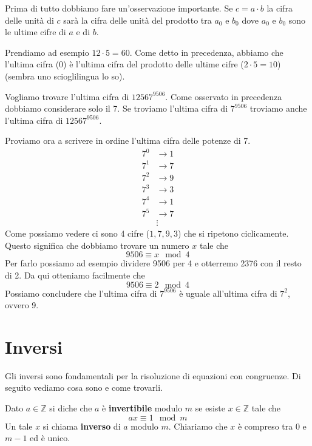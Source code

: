 Prima di tutto dobbiamo fare un'osservazione importante. Se $c = a \cdot b$ la cifra delle
unit\`a di $c$ sar\`a la cifra delle unit\`a del prodotto tra $a_0$ e $b_0$ dove $a_0$ e $b_0$
sono le ultime cifre di $a$ e di $b$.

\begin{example}
	Prendiamo ad esempio $12 \cdot 5 = 60$. Come detto in precedenza, abbiamo che l'ultima
	cifra (0) \`e l'ultima cifra del prodotto delle ultime cifre ($2 \cdot 5 = 10$)
	(sembra uno scioglilingua lo so).
\end{example}

\begin{example}
	Vogliamo trovare l'ultima cifra di $12567^{9506}$. Come osservato in precedenza dobbiamo
	considerare solo il 7. Se troviamo l'ultima cifra di $7^{9506}$ troviamo anche l'ultima
	cifra di $12567^{9506}$.

	Proviamo ora a scrivere in ordine l'ultima cifra delle potenze di 7.
	\begin{equation*}
		\begin{array}{rl}
			7^0 & \rightarrow 1 \\
			7^1 & \rightarrow 7 \\
			7^2 & \rightarrow 9 \\
			7^3 & \rightarrow 3 \\
			7^4 & \rightarrow 1 \\
			7^5 & \rightarrow 7 \\
			    & \vdots
		\end{array}
	\end{equation*}
	Come possiamo vedere ci sono 4 cifre ($1, 7, 9, 3$) che si ripetono ciclicamente. Questo
	significa che dobbiamo trovare un numero $x$ tale che
	\begin{equation*}
		9506 \equiv x \mod{4}
	\end{equation*}
	Per farlo possiamo ad esempio dividere 9506 per 4 e otterremo 2376 con il resto di 2.
	Da qui otteniamo facilmente che
	\begin{equation*}
		9506 \equiv 2 \mod{4}
	\end{equation*}
	Possiamo concludere che l'ultima cifra di $7^{9506}$ \`e uguale all'ultima cifra di
	$7^2$, ovvero 9.
\end{example}

\section{Inversi}
Gli inversi sono fondamentali per la risoluzione di equazioni con congruenze. Di seguito
vediamo cosa sono e come trovarli.
\begin{defn}
	Dato $a \in \mathbb{Z}$ si diche che $a$ \`e \textbf{invertibile} modulo $m$ se esiste
	$x \in \mathbb{Z}$ tale che
	\begin{equation*}
		ax \equiv 1 \mod{m}
	\end{equation*}
	Un tale $x$ si chiama \textbf{inverso} di $a$ modulo $m$. Chiariamo che $x$ \`e compreso
	tra 0 e $m - 1$ ed \`e unico.
\end{defn}

